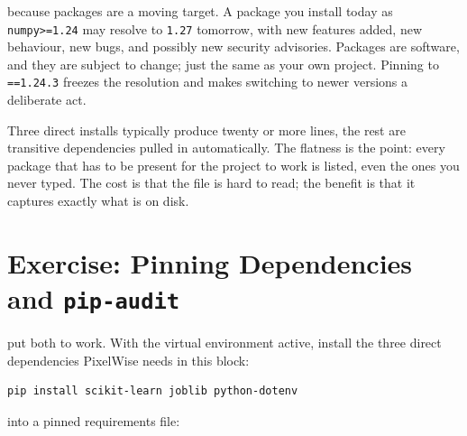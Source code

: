  because packages are a moving target.
A package you install today as \texttt{numpy>=1.24} may resolve to
\texttt{1.27} tomorrow, with new features added, new behaviour, new bugs, and possibly new
security advisories. Packages are software, and they are subject to change; just the same as your own project.
Pinning to \texttt{==1.24.3} freezes the resolution and makes switching to newer versions a deliberate act.


Three direct installs typically produce twenty or more lines, the rest are
transitive dependencies pulled in automatically.
The flatness is the point: every package that has to be present for the
project to work is listed, even the ones you never typed.
The cost is that the file is hard to read; the benefit is that it captures
exactly what is on disk.



\newpage
\section{Exercise: Pinning Dependencies and \texttt{pip-audit}}

 put both to work.
With the virtual environment active, install the three direct dependencies
PixelWise needs in this block:

\begin{verbatim}
pip install scikit-learn joblib python-dotenv
\end{verbatim}

 into a pinned requirements file:

